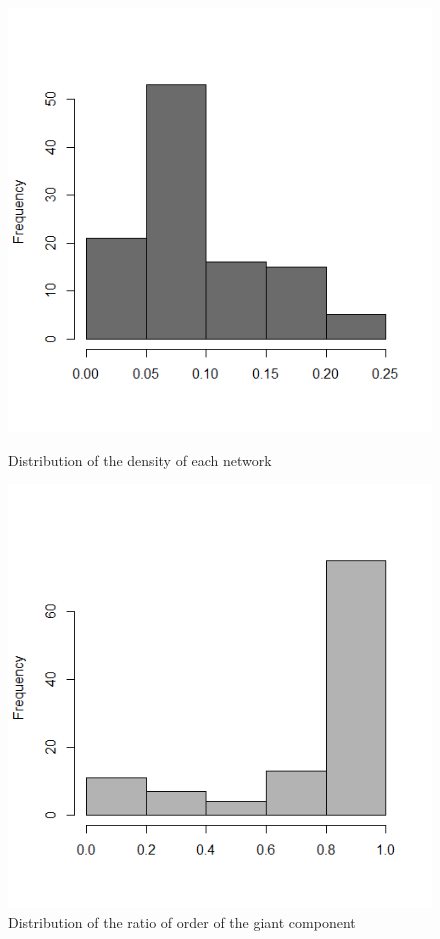 \documentclass[11pt]{article}       %
\begin{document}
\newpage
\begin{figure}[H]
\centering
\begin{minipage}[b]{0.45\linewidth}
\vspace{0pt}
\includegraphics[width=\linewidth]{densitydist.png}
\caption{Distribution of the density of each network}
\end{minipage}
\hspace{0.5cm}
\begin{minipage}[b]{0.45\linewidth}
\centering
\includegraphics[width=\linewidth]{ratiocomponent.png}
\caption{Distribution of the ratio of order of the giant component}
\end{minipage}
\end{figure}
\end{document}

